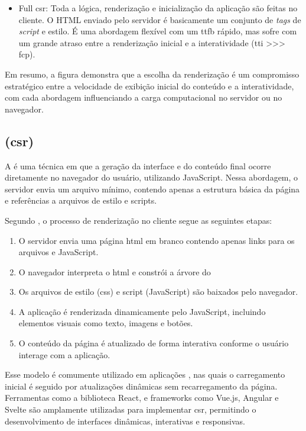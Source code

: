 \begin{itemize}
    \item Full \acrshort{csr}: Toda a lógica, renderização e inicialização da aplicação são feitas no cliente. O HTML enviado pelo servidor é basicamente um conjunto de \textit{tags} de \textit{script} e estilo. É uma abordagem flexível com um \acrshort{ttfb} rápido, mas sofre com um grande atraso entre a renderização inicial e a interatividade (\acrshort{tti} >>> \acrshort{fcp}).
\end{itemize}

Em resumo, a figura demonstra que a escolha da renderização é um compromisso estratégico entre a velocidade de exibição inicial do conteúdo e a interatividade, com cada abordagem influenciando a carga computacional no servidor ou no navegador.

\subsection{ (\acrshort{csr})}
\label{subsec:csr}

A \textbf{} é uma técnica em que a geração da interface e do conteúdo final ocorre diretamente no navegador do usuário, utilizando JavaScript. Nessa abordagem, o servidor envia um arquivo  mínimo, contendo apenas a estrutura básica da página e referências a arquivos de estilo e scripts.{\cite{atori2024}}

Segundo , o processo de renderização no cliente segue as seguintes etapas:

\begin{enumerate}
    \item O servidor envia uma página \acrshort{html} em branco contendo apenas links para os arquivos  e JavaScript.
    \item O navegador interpreta o \acrshort{html} e constrói a árvore do 
    \item Os arquivos de estilo (\acrshort{css}) e script (JavaScript) são baixados pelo navegador.
    \item A aplicação é renderizada dinamicamente pelo JavaScript, incluindo elementos visuais como texto, imagens e botões.
    \item O conteúdo da página é atualizado de forma interativa conforme o usuário interage com a aplicação.
\end{enumerate}

Esse modelo é comumente utilizado em aplicações , nas quais o carregamento inicial é seguido por atualizações dinâmicas sem recarregamento da página. Ferramentas como a biblioteca React, e frameworks como Vue.js, Angular e Svelte são amplamente utilizadas para implementar \acrshort{csr}, permitindo o desenvolvimento de interfaces dinâmicas, interativas e responsivas.


